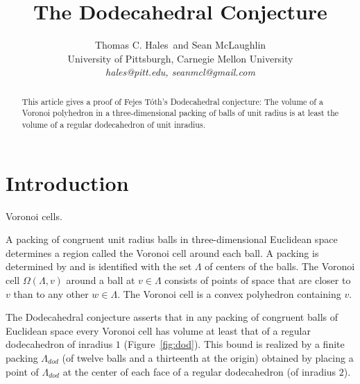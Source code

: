 \documentclass{article} %
\begin{document}
\title{The Dodecahedral Conjecture}
\author{Thomas C. Hales\ and Sean McLaughlin \\
        \normalsize{University of Pittsburgh, Carnegie Mellon University} \\
        \normalsize{\it{hales@pitt.edu, seanmcl@gmail.com}}}
\date{}
\maketitle

\begin{abstract}  
This article gives a proof of Fejes T\'oth's Dodecahedral conjecture:
The volume of a Voronoi polyhedron in a three-dimensional packing of
balls of unit radius is at least the volume of a regular dodecahedron
of unit inradius.
\end{abstract}


\section{Introduction}

\begin{floatingfigure}{55mm}
  \begin{center}
   \end{center}
  \caption{Voronoi cells.}
  \label{fig:voronoi}
\end{floatingfigure}

A packing of congruent unit radius balls in three-dimensional
Euclidean space determines a region called the Voronoi cell around
each ball. A packing is determined by and is identified with the set
$\Lambda$ of centers of the balls. The Voronoi cell
$\Omega(\Lambda,v)$ around a ball at $v\in \Lambda$ consists of points
of space that are closer to $v$ than to any other $w\in\Lambda$. The
Voronoi cell is a convex polyhedron containing $v$.

The Dodecahedral conjecture asserts that in any packing of congruent balls of Euclidean
space every Voronoi cell has volume at least that of a regular dodecahedron
of inradius $1$ (Figure~\ref{fig:dod}).    This bound is realized by a finite 
packing $\Lambda_{dod}$
(of twelve balls and a thirteenth  at the origin) obtained
by placing a point of $\Lambda_{dod}$ at the center of each face of a regular dodecahedron (of inradius $2$).
\end{document}
